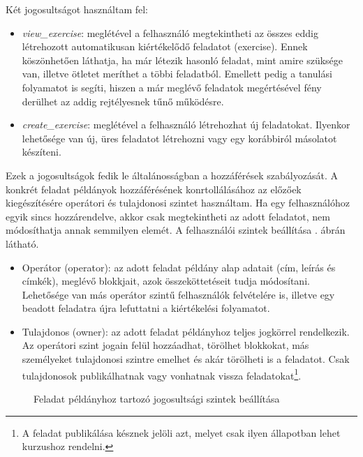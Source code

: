Két jogosultságot használtam fel:

\begin{itemize}
    \item \textit{view\_exercise}: meglétével a felhasználó megtekintheti az összes eddig létrehozott automatikusan kiértékelődő feladatot (exercise). Ennek köszönhetően láthatja, ha már létezik hasonló feladat, mint amire szüksége van, illetve ötletet meríthet a többi feladatból. Emellett pedig a tanulási folyamatot is segíti, hiszen a már meglévő feladatok megértésével fény derülhet az addig rejtélyesnek tűnő működésre.
    \item \textit{create\_exercise}: meglétével a felhasználó létrehozhat új feladatokat. Ilyenkor lehetősége van új, üres feladatot létrehozni vagy egy korábbiról másolatot készíteni.
\end{itemize}

Ezek a jogosultságok fedik le általánosságban a hozzáférések szabályozását. A konkrét feladat példányok hozzáférésének konrtollálásához az előzőek kiegészítésére operátori és tulajdonosi szintet használtam. Ha egy felhasználóhoz egyik sincs hozzárendelve, akkor csak megtekintheti az adott feladatot, nem módosíthatja annak semmilyen elemét. A felhasználói szintek beállítása . ábrán látható.

\begin{itemize}
    \item Operátor (operator): az adott feladat példány alap adatait (cím, leírás és címkék), meglévő blokkjait, azok összeköttetéseit tudja módosítani. Lehetősége van más operátor szintű felhasználók felvételére is, illetve egy beadott feladatra újra lefuttatni a kiértékelési folyamatot.
    \item Tulajdonos (owner): az adott feladat példányhoz teljes jogkörrel rendelkezik. Az operátori szint jogain felül hozzáadhat, törölhet blokkokat, más személyeket tulajdonosi szintre emelhet és akár törölheti is a feladatot. Csak tulajdonosok publikálhatnak vagy vonhatnak vissza feladatokat\footnote{A feladat publikálása késznek jelöli azt, melyet csak ilyen állapotban lehet kurzushoz rendelni.}.
\end{itemize}

\begin{figure}[h]
    \centering
    \caption{Feladat példányhoz tartozó jogosultsági szintek beállítása}
    \label{fig:exercise_perms}
\end{figure}


